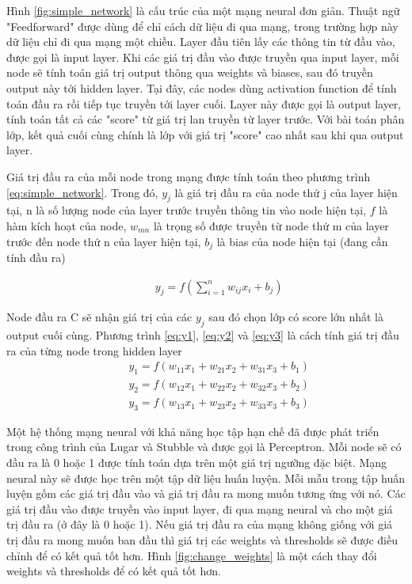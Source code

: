Hình \ref{fig:simple_network} là cấu trúc của một mạng neural đơn giản. Thuật ngữ "Feedforward" được dùng để chỉ cách dữ liệu đi qua mạng, trong trường hợp này dữ liệu chỉ đi qua mạng một chiều. Layer đầu tiên lấy các thông tin từ đầu vào, được gọi là input layer. Khi các giá trị đầu vào được truyền qua input layer, mỗi node sẽ tính toán giá trị output thông qua weights và biases, sau đó truyền output này tới hidden layer. Tại đây, các nodes dùng activation function để tính toán đầu ra rồi tiếp tục truyền tới layer cuối. Layer này được gọi là output layer, tính toán tất cả các "score" từ giá trị lan truyền từ layer trước. Với bài toán phân lớp, kết quả cuối cùng chính là lớp với giá trị "score" cao nhất sau khi qua output layer.

Giá trị đầu ra của mỗi node trong mạng được tính toán theo phương trình \ref{eq:simple_network}. Trong đó, $y_{j}$ là giá trị đầu ra của node thứ j của layer hiện tại, n là số lượng node của layer trước truyền thông tin vào node hiện tại, $f$ là hàm kích hoạt của node, $w_{mn}$ là trọng số được truyền từ node thứ m của layer trước đến node thứ n của layer hiện tại, $b_j$ là bias của node hiện tại (đang cần tính đầu ra)

\begin{eqnarray}
\label{eq:simple_network}
\hspace{1cm} y_{j} = f(\sum_{i=1}^{n} {w_{ij}x_i} + b_j)
\end{eqnarray}

Node đầu ra C sẽ nhận giá trị của các $y_j$ sau đó chọn lớp có score lớn nhất là output cuối cùng. Phương trình \ref{eq:y1}, \ref{eq:y2} và \ref{eq:y3} là cách tính giá trị đầu ra của từng node trong hidden layer
\begin{eqnarray}
\label{eq:y1}
\hspace{1cm} y_{1} = f(w_{11}x_1 + w_{21}x_2 + w_{31}x_3  + b_1)\\
\label{eq:y2}
\hspace{1cm} y_{2} = f(w_{12}x_1 + w_{22}x_2 + w_{32}x_3  + b_2)\\
\label{eq:y3}
\hspace{1cm} y_{3} = f(w_{13}x_1 + w_{23}x_2 + w_{33}x_3  + b_3)
\end{eqnarray}

Một hệ thống mạng neural với khả năng học tập hạn chế đã được phát triển trong công trình của Lugar và Stubble \cite{luger2005artificial} và được gọi là Perceptron. Mỗi node sẽ có đầu ra là 0 hoặc 1 được tính toán dựa trên một giá trị ngưỡng đặc biệt. Mạng neural này sẽ được học trên một tập dữ liệu huấn luyện. Mỗi mẫu trong tập huấn luyện gốm các giá trị đầu vào và giá trị đầu ra mong muốn tương ứng với nó. Các giá trị đầu vào được truyền vào input layer, đi qua mạng neural và cho một giá trị đầu ra (ở đây là 0 hoặc 1). Nếu giá trị đầu ra của mạng không giống với giá trị đầu ra mong muốn ban đầu thì giá trị các weights và thresholds sẽ được điều chỉnh để có kết quả tốt hơn. Hình \ref{fig:change_weights} là một cách thay đổi weights và thresholds để có kết quả tốt hơn.

